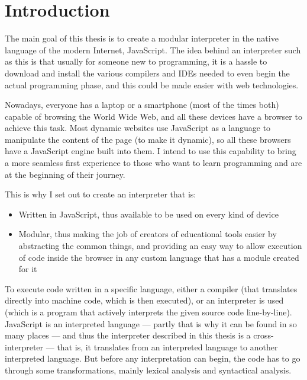 \chapter*{Introduction}

The main goal of this thesis is to create a modular interpreter in the native language of the modern Internet, JavaScript. The idea behind an interpreter such as this is that usually for someone new to programming, it is a hassle to download and install the various compilers and IDEs needed to even begin the actual programming phase, and this could be made easier with web technologies.

Nowadays, everyone has a laptop or a smartphone (most of the times both) capable of browsing the World Wide Web, and all these devices have a browser to achieve this task. Most dynamic websites use JavaScript as a language to manipulate the content of the page (to make it dynamic), so all these browsers have a JavaScript engine built into them. I intend to use this capability to bring a more seamless first experience to those who want to learn programming and are at the beginning of their journey. 

This is why I set out to create an interpreter that is:
\begin{itemize}
\item Written in JavaScript, thus available to be used on every kind of device
\item Modular, thus making the job of creators of educational tools easier by abstracting the common things, and providing an easy way to allow execution of code inside the browser in any custom language that has a module created for it
\end{itemize}

To execute code written in a specific language, either a compiler (that translates directly into machine code, which is then executed), or an interpreter is used (which is a program that actively interprets the given source code line-by-line). JavaScript is an interpreted language --- partly that is why it can be found in so many places --- and thus the interpreter described in this thesis is a cross-interpreter --- that is, it translates from an interpreted language to another interpreted language. But before any interpretation can begin, the code has to go through some transformations, mainly lexical analysis and syntactical analysis.

